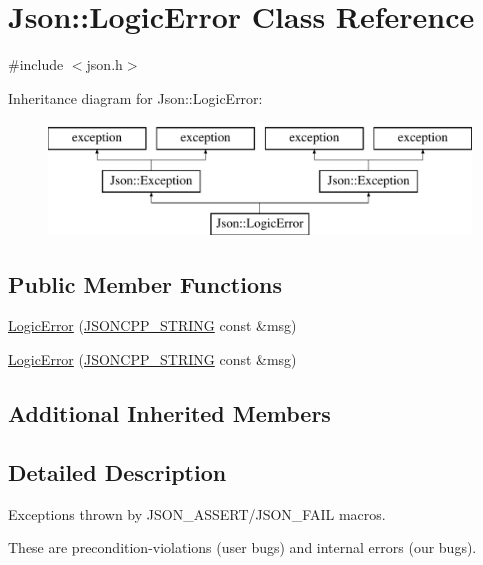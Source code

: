 \hypertarget{class_json_1_1_logic_error}{}\section{Json\+:\+:Logic\+Error Class Reference}
\label{class_json_1_1_logic_error}


{\ttfamily \#include $<$json.\+h$>$}

Inheritance diagram for Json\+:\+:Logic\+Error\+:\begin{figure}[H]
\begin{center}
\leavevmode
\includegraphics[height=3.000000cm]{class_json_1_1_logic_error}
\end{center}
\end{figure}
\subsection*{Public Member Functions}
\begin{DoxyCompactItemize}
\item 
\hyperlink{class_json_1_1_logic_error_acca679aa49768a4a1de7b705c67c2919}{Logic\+Error} (\hyperlink{config_8h_a1e723f95759de062585bc4a8fd3fa4be}{J\+S\+O\+N\+C\+P\+P\+\_\+\+S\+T\+R\+I\+NG} const \&msg)
\item 
\hyperlink{class_json_1_1_logic_error_acca679aa49768a4a1de7b705c67c2919}{Logic\+Error} (\hyperlink{config_8h_a1e723f95759de062585bc4a8fd3fa4be}{J\+S\+O\+N\+C\+P\+P\+\_\+\+S\+T\+R\+I\+NG} const \&msg)
\end{DoxyCompactItemize}
\subsection*{Additional Inherited Members}


\subsection{Detailed Description}
Exceptions thrown by J\+S\+O\+N\+\_\+\+A\+S\+S\+E\+R\+T/\+J\+S\+O\+N\+\_\+\+F\+A\+IL macros.

These are precondition-\/violations (user bugs) and internal errors (our bugs).

